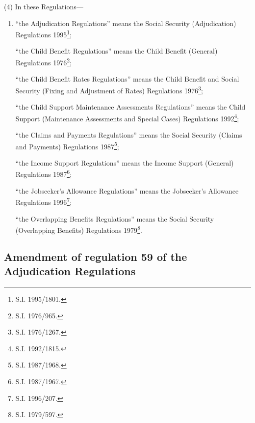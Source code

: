 \documentclass[12pt,a4paper]{article}
\begin{document}
(4) In these Regulations—
\begin{enumerate}\item[]
“the Adjudication Regulations” means the Social Security (Adjudication) Regulations 1995\footnote{\frenchspacing S.I. 1995/1801.};

“the Child Benefit Regulations” means the Child Benefit (General) Regulations 1976\footnote{\frenchspacing S.I. 1976/965.};

“the Child Benefit Rates Regulations” means the Child Benefit and Social Security (Fixing and Adjustment of Rates) Regulations 1976\footnote{\frenchspacing S.I. 1976/1267.};

“the Child Support Maintenance Assessments Regulations” means the Child Support (Maintenance Assessments and Special Cases) Regulations 1992\footnote{\frenchspacing S.I. 1992/1815.};

“the Claims and Payments Regulations” means the Social Security (Claims and Payments) Regulations 1987\footnote{\frenchspacing S.I. 1987/1968.};



“the Income Support Regulations” means the Income Support (General) Regulations 1987\footnote{\frenchspacing S.I. 1987/1967.};

\begin{sloppypar}
“the Jobseeker’s Allowance Regulations” means the Jobseeker’s Allowance Regulations 1996\footnote{\frenchspacing S.I. 1996/207.};
\end{sloppypar}

“the Overlapping Benefits Regulations” means the Social Security (Overlapping Benefits) Regulations 1979\footnote{\frenchspacing S.I. 1979/597.}.
\end{enumerate}


\subsection[2. Amendment of regulation 59 of the Adjudication Regulations]{Amendment of regulation 59 of the Adjudication Regulations}
\end{document}
